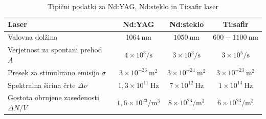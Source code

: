\begin{table}[ht]
\small
\begin{center}
\begin{tabular}{|l|c|c|c|}\hline
Laser & Nd:YAG & Nd:steklo & Ti:safir \\ \hline
Valovna dolžina  & $1064~\si{\nano\metre}$ & $1050~\si{\nano\metre}$ & 
 $600-1100~\si{\nano\metre}$\\ \hline
Verjetnost za spontani prehod $A$ & $4 \times 10^3/\si{\second}$ & $3 \times 10^3/\si{\second}$
& $3 \times 10^5/\si{\second}$\\ \hline
Presek za stimulirano emisijo $\sigma$ & $3 \times 10^{-23}~\si{\metre}^2$ &
$3 \times 10^{-24}~\si{\metre}^2$ & $3 \times 10^{-23}~\si{\metre}^2$\\ \hline
Spektralna širina črte $\Delta \nu$ & $1,3 \times 10^{11}~\si{\hertz}$ &
$7 \times 10^{12}~\si{\hertz}$ & $1 \times 10^{14}~\si{\hertz}$\\ \hline
Gostota obrnjene zasedenosti $\Delta N/V$ & $1,6 \times 10^{23}/\si{\metre}^3$ &
$8 \times 10^{23}/\si{\metre}^3$ & $6 \times 10^{23}/\si{\metre}^3$\\ \hline
\end{tabular}
\caption{Tipični podatki za Nd:YAG, Nd:steklo in Ti:safir laser}
\label{tab:nd}
\end{center}
\end{table}
\newpage
